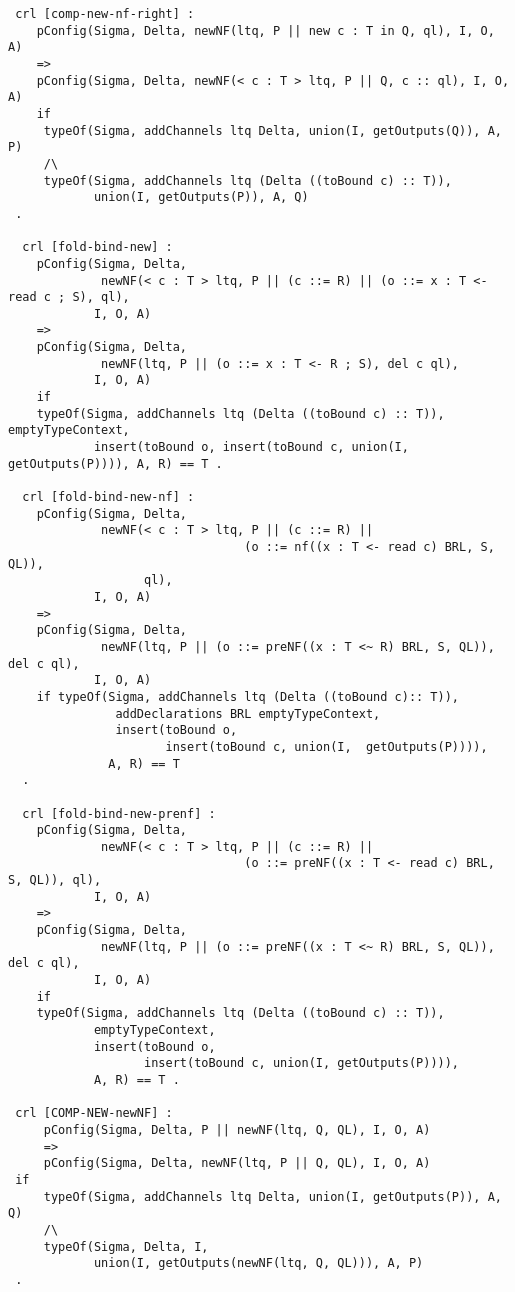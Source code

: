 \begin{lstlisting}
 crl [comp-new-nf-right] :
    pConfig(Sigma, Delta, newNF(ltq, P || new c : T in Q, ql), I, O, A)
    =>
    pConfig(Sigma, Delta, newNF(< c : T > ltq, P || Q, c :: ql), I, O, A) 
    if
     typeOf(Sigma, addChannels ltq Delta, union(I, getOutputs(Q)), A, P) 
     /\
     typeOf(Sigma, addChannels ltq (Delta ((toBound c) :: T)), 
            union(I, getOutputs(P)), A, Q) 
 .
 
  crl [fold-bind-new] :
    pConfig(Sigma, Delta, 
             newNF(< c : T > ltq, P || (c ::= R) || (o ::= x : T <- read c ; S), ql),
            I, O, A)
    => 
    pConfig(Sigma, Delta, 
             newNF(ltq, P || (o ::= x : T <- R ; S), del c ql),
            I, O, A) 
    if 
    typeOf(Sigma, addChannels ltq (Delta ((toBound c) :: T)), emptyTypeContext, 
            insert(toBound o, insert(toBound c, union(I, getOutputs(P)))), A, R) == T . 
           
  crl [fold-bind-new-nf] :
    pConfig(Sigma, Delta, 
             newNF(< c : T > ltq, P || (c ::= R) || 
                                 (o ::= nf((x : T <- read c) BRL, S, QL)), 
                   ql),
            I, O, A)
    => 
    pConfig(Sigma, Delta, 
             newNF(ltq, P || (o ::= preNF((x : T <~ R) BRL, S, QL)), del c ql),
            I, O, A) 
    if typeOf(Sigma, addChannels ltq (Delta ((toBound c):: T)),
               addDeclarations BRL emptyTypeContext, 
               insert(toBound o, 
                      insert(toBound c, union(I,  getOutputs(P)))), 
              A, R) == T 
  .  
            
  crl [fold-bind-new-prenf] :
    pConfig(Sigma, Delta, 
             newNF(< c : T > ltq, P || (c ::= R) || 
                                 (o ::= preNF((x : T <- read c) BRL, S, QL)), ql),
            I, O, A)
    => 
    pConfig(Sigma, Delta, 
             newNF(ltq, P || (o ::= preNF((x : T <~ R) BRL, S, QL)), del c ql),
            I, O, A) 
    if        
    typeOf(Sigma, addChannels ltq (Delta ((toBound c) :: T)), 
            emptyTypeContext, 
            insert(toBound o, 
                   insert(toBound c, union(I, getOutputs(P)))), 
            A, R) == T .
            
 crl [COMP-NEW-newNF] :
     pConfig(Sigma, Delta, P || newNF(ltq, Q, QL), I, O, A)
     =>   
     pConfig(Sigma, Delta, newNF(ltq, P || Q, QL), I, O, A)
 if
     typeOf(Sigma, addChannels ltq Delta, union(I, getOutputs(P)), A, Q)
     /\
     typeOf(Sigma, Delta, I, 
            union(I, getOutputs(newNF(ltq, Q, QL))), A, P)     
 .
   

\end{lstlisting}
